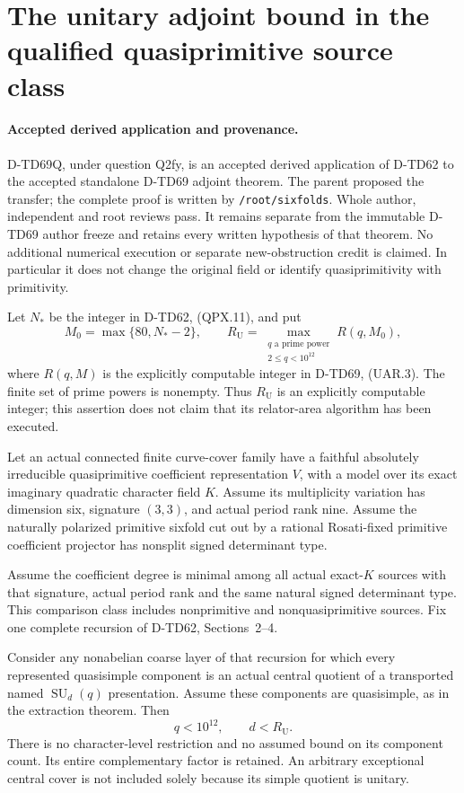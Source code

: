 \section{The unitary adjoint bound in the qualified quasiprimitive source class}
\label{sec:unitary-adjoint-quasiprimitive-corollary}

\paragraph{Accepted derived application and provenance.}
D-TD69Q, under question Q2fy, is an accepted derived application of
D-TD62 to the accepted standalone D-TD69 adjoint theorem. The parent
proposed the transfer; the complete proof is written by
\texttt{/root/sixfolds}. Whole author, independent and root reviews pass.
It remains separate from the immutable D-TD69 author freeze and retains
every written hypothesis of that theorem. No additional numerical
execution or separate new-obstruction credit is claimed. In particular it does not change the original field or
identify quasiprimitivity with primitivity.

Let \(N_*\) be the integer in D-TD62, (QPX.11), and put
\[
 M_0=\max\{80,N_*-2\},\qquad
 R_{\mathrm U}
   =\max_{\substack{q\text{ a prime power}\\2\le q<10^{12}}}
                 R(q,M_0),
 \tag{QUA.1}
\]
where \(R(q,M)\) is the explicitly computable integer in D-TD69,
(UAR.3). The finite set of prime powers is nonempty. Thus
\(R_{\mathrm U}\) is an explicitly computable integer; this assertion
does not claim that its relator-area algorithm has been executed.

\begin{corollary}
Let an actual connected finite curve-cover family have a faithful
absolutely irreducible quasiprimitive coefficient representation \(V\),
with a model over its exact imaginary quadratic character field \(K\).
Assume its multiplicity variation has dimension six, signature
\((3,3)\), and actual period rank nine. Assume the naturally polarized
primitive sixfold cut out by a rational Rosati-fixed primitive
coefficient projector has nonsplit signed determinant type.

Assume the coefficient degree is minimal among all actual exact-\(K\)
sources with that signature, actual period rank and the same natural
signed determinant type. This comparison class includes nonprimitive
and nonquasiprimitive sources. Fix one complete recursion of
D-TD62, Sections~2--4.

Consider any nonabelian coarse layer of that recursion for which
every represented quasisimple component is an actual central quotient
of a transported named \(\operatorname{SU}_d(q)\) presentation.
Assume these components are quasisimple, as in the extraction theorem.
Then
\[
                         q<10^{12},\qquad d<R_{\mathrm U}.
 \tag{QUA.2}
\]
There is no character-level restriction and no assumed bound on its
component count. Its entire complementary factor is retained.
An arbitrary exceptional central cover is not included solely because
its simple quotient is unitary.
\end{corollary}

